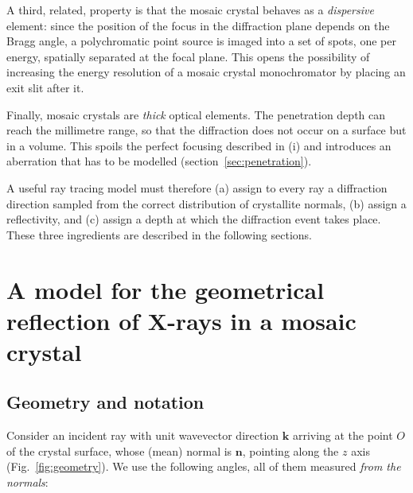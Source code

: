 \documentclass{iucr}
\begin{document}
A third, related, property is that the mosaic crystal behaves as a \emph{dispersive}
element: since the position of the focus in the diffraction plane depends on the
Bragg angle, a polychromatic point source is imaged into a set of spots, one per
energy, spatially separated at the focal plane. This opens the possibility of
increasing the energy resolution of a mosaic crystal monochromator by placing an
exit slit after it.

Finally, mosaic crystals are \emph{thick} optical elements. The penetration depth
can reach the millimetre range, so that the diffraction does not occur on a surface
but in a volume. This spoils the perfect focusing described in (i) and introduces
an aberration that has to be modelled (section~\ref{sec:penetration}).

A useful ray tracing model must therefore (a) assign to every ray a diffraction
direction sampled from the correct distribution of crystallite normals, (b) assign
a reflectivity, and (c) assign a depth at which the diffraction event takes place.
These three ingredients are described in the following sections.


\section{A model for the geometrical reflection of X-rays in a mosaic crystal}
\label{sec:geometry}

\subsection{Geometry and notation}
\label{sec:geometry:notation}

Consider an incident ray with unit wavevector direction $\mathbf{k}$ arriving at
the point $O$ of the crystal surface, whose (mean) normal is $\mathbf{n}$, pointing
along the $z$ axis (Fig.~\ref{fig:geometry}). We use the following angles, all of
them measured \emph{from the normals}:
\end{document}
